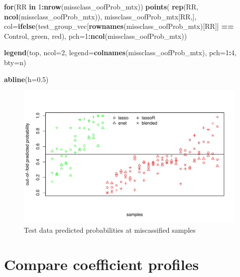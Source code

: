 \documentclass[
]{book}
\newenvironment{Shaded}{\begin{snugshade}}{\end{snugshade}}
\newcommand{\ControlFlowTok}[1]{\textcolor[rgb]{0.13,0.29,0.53}{\textbf{#1}}}
\newcommand{\DataTypeTok}[1]{\textcolor[rgb]{0.13,0.29,0.53}{#1}}
\newcommand{\DecValTok}[1]{\textcolor[rgb]{0.00,0.00,0.81}{#1}}
\newcommand{\FloatTok}[1]{\textcolor[rgb]{0.00,0.00,0.81}{#1}}
\newcommand{\KeywordTok}[1]{\textcolor[rgb]{0.13,0.29,0.53}{\textbf{#1}}}
\newcommand{\NormalTok}[1]{#1}
\newcommand{\OperatorTok}[1]{\textcolor[rgb]{0.81,0.36,0.00}{\textbf{#1}}}
\newcommand{\StringTok}[1]{\textcolor[rgb]{0.31,0.60,0.02}{#1}}
\begin{document}
\begin{Shaded}
\begin{Highlighting}[]
\ControlFlowTok{for}\NormalTok{(RR }\ControlFlowTok{in} \DecValTok{1}\OperatorTok{:}\KeywordTok{nrow}\NormalTok{(missclass\_oofProb\_mtx))}
\KeywordTok{points}\NormalTok{(}
 \KeywordTok{rep}\NormalTok{(RR, }\KeywordTok{ncol}\NormalTok{(missclass\_oofProb\_mtx)), }
\NormalTok{ missclass\_oofProb\_mtx[RR,],}
 \DataTypeTok{col=}\KeywordTok{ifelse}\NormalTok{(test\_group\_vec[}\KeywordTok{rownames}\NormalTok{(missclass\_oofProb\_mtx)[RR]] }\OperatorTok{==}\StringTok{ \textquotesingle{}Control\textquotesingle{}}\NormalTok{,}
  \StringTok{\textquotesingle{}green\textquotesingle{}}\NormalTok{, }\StringTok{\textquotesingle{}red\textquotesingle{}}\NormalTok{),}
 \DataTypeTok{pch=}\DecValTok{1}\OperatorTok{:}\KeywordTok{ncol}\NormalTok{(missclass\_oofProb\_mtx))}

\KeywordTok{legend}\NormalTok{(}\StringTok{\textquotesingle{}top\textquotesingle{}}\NormalTok{, }\DataTypeTok{ncol=}\DecValTok{2}\NormalTok{, }\DataTypeTok{legend=}\KeywordTok{colnames}\NormalTok{(missclass\_oofProb\_mtx), }
 \DataTypeTok{pch=}\DecValTok{1}\OperatorTok{:}\DecValTok{4}\NormalTok{, }\DataTypeTok{bty=}\StringTok{\textquotesingle{}n\textquotesingle{}}\NormalTok{)}

\KeywordTok{abline}\NormalTok{(}\DataTypeTok{h=}\FloatTok{0.5}\NormalTok{)}
\end{Highlighting}
\end{Shaded}

\begin{figure}
\centering
\includegraphics{Static/figures/misclassTest-1.pdf}
\caption{\label{fig:misclassTest}Test data predicted probabilities at miscassified samples}
\end{figure}

\hypertarget{compare-coefficient-profiles}{%
\section{Compare coefficient profiles}\label{compare-coefficient-profiles}}
\end{document}
